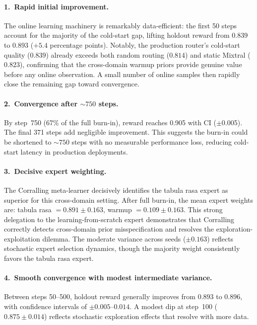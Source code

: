 \paragraph{1.\ Rapid initial improvement.}
The online learning machinery is remarkably data-efficient: the first 50
steps account for the majority of the cold-start gap, lifting holdout reward
from $0.839$ to $0.893$ ($+5.4$ percentage points).  Notably, the
production router's cold-start quality ($0.839$) already exceeds both random
routing ($0.814$) and static Mixtral ($0.823$), confirming that the
cross-domain warmup priors provide genuine value before any online
observation.  A small number of online samples then rapidly close the
remaining gap toward convergence.

\paragraph{2.\ Convergence after ${\sim}750$ steps.}
By step~750 (67\% of the full burn-in), reward reaches 0.905 with CI
($\pm$0.005).  The final 371 steps add negligible improvement.
This suggests the burn-in could be shortened to ${\sim}750$ steps with no
measurable performance loss, reducing cold-start latency in production
deployments.

\paragraph{3.\ Decisive expert weighting.}
The Corralling meta-learner decisively identifies the tabula rasa expert
as superior for this cross-domain setting.  After full burn-in, the mean
expert weights are: tabula rasa $= 0.891 \pm 0.163$,
warmup $= 0.109 \pm 0.163$.  This strong delegation to the
learning-from-scratch expert demonstrates that Corralling correctly detects
cross-domain prior misspecification and resolves the exploration-exploitation
dilemma.  The moderate variance across seeds ($\pm 0.163$) reflects
stochastic expert selection dynamics, though the majority weight
consistently favors the tabula rasa expert.

\paragraph{4.\ Smooth convergence with modest intermediate variance.}
Between steps 50--500, holdout reward generally improves from $0.893$
to $0.896$, with confidence intervals of $\pm 0.005$--$0.014$.  A modest
dip at step~100 ($0.875 \pm 0.014$) reflects stochastic exploration
effects that resolve with more data.

